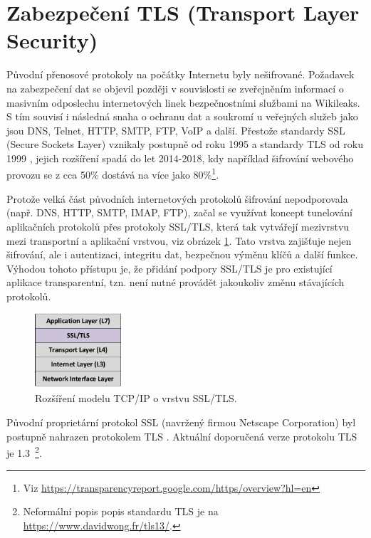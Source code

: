 \section{Zabezpečení TLS (Transport Layer Security)}\label{tls}
Původní přenosové protokoly na počátky Internetu byly nešifrované. Požadavek na zabezpečení dat se objevil později v souvislosti se zveřejněním informací o masivním odposlechu internetových linek bezpečnostními službami na Wikileaks. S tím souvisí i následná snaha o ochranu dat a soukromí u veřejných služeb jako jsou DNS, Telnet, HTTP, SMTP, FTP, VoIP a další. Přestože standardy SSL (Secure Sockets Layer) vznikaly postupně od roku 1995  a standardy TLS od roku 1999 \cite{rfc2246}, jejich rozšíření spadá do let 2014-2018, kdy například šifrování webového provozu se z cca 50\% dostává na více jako 80\%\footnote{Viz \url{https://transparencyreport.google.com/https/overview?hl=en}}.

Protože velká část původních internetových protokolů šifrování nepodporovala (např. DNS, HTTP, SMTP, IMAP, FTP), začal se využívat koncept tunelování aplikačních protokolů přes protokoly SSL/TLS, která tak vytvářejí mezivrstvu mezi transportní a aplikační vrstvou, viz obrázek \ref{fig:tls}. Tato vrstva zajišťuje nejen šifrování, ale i autentizaci, integritu dat, bezpečnou výměnu klíčů a další funkce. Výhodou tohoto přístupu je, že přidání podpory SSL/TLS je pro existující aplikace transparentní, tzn. není nutné provádět jakoukoliv změnu stávajících protokolů.

\begin{figure}[h]
  \centering
    \includegraphics[width=0.3\textwidth]{fig/tls.pdf}
  \caption{Rozšíření modelu TCP/IP o vrstvu SSL/TLS.}
 \label{fig:tls}
\end{figure}

Původní proprietární protokol SSL (navržený firmou Netscape Corporation) byl postupně nahrazen protokolem TLS \cite{RFC7568}. Aktuální doporučená verze protokolu TLS je 1.3~\cite{RFC8446}\footnote{Neformální popis popis standardu TLS je na \url{https://www.davidwong.fr/tls13/}.}.

